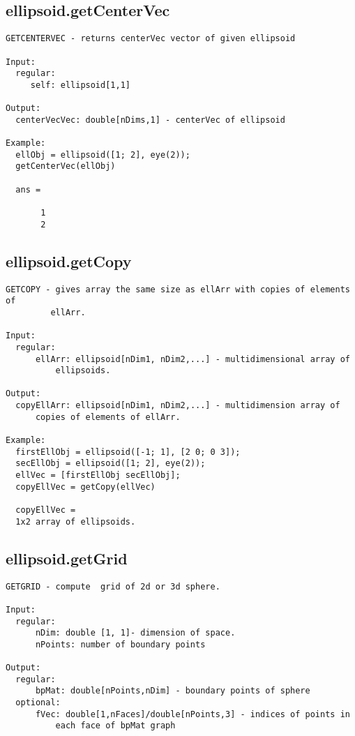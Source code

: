 \subsection{\texorpdfstring{ellipsoid.getCenterVec}{getCenterVec}}\label{method:ellipsoid.getCenterVec}
\begin{verbatim}
GETCENTERVEC - returns centerVec vector of given ellipsoid

Input:
  regular:
     self: ellipsoid[1,1]

Output:
  centerVecVec: double[nDims,1] - centerVec of ellipsoid

Example:
  ellObj = ellipsoid([1; 2], eye(2));
  getCenterVec(ellObj)

  ans =

       1
       2
\end{verbatim}
\subsection{\texorpdfstring{ellipsoid.getCopy}{getCopy}}\label{method:ellipsoid.getCopy}
\begin{verbatim}
GETCOPY - gives array the same size as ellArr with copies of elements of
         ellArr.

Input:
  regular:
      ellArr: ellipsoid[nDim1, nDim2,...] - multidimensional array of
          ellipsoids.

Output:
  copyEllArr: ellipsoid[nDim1, nDim2,...] - multidimension array of
      copies of elements of ellArr.

Example:
  firstEllObj = ellipsoid([-1; 1], [2 0; 0 3]);
  secEllObj = ellipsoid([1; 2], eye(2));
  ellVec = [firstEllObj secEllObj];
  copyEllVec = getCopy(ellVec)

  copyEllVec =
  1x2 array of ellipsoids.
\end{verbatim}
\subsection{\texorpdfstring{ellipsoid.getGrid}{getGrid}}\label{method:ellipsoid.getGrid}
\begin{verbatim}
GETGRID - compute  grid of 2d or 3d sphere.

Input:
  regular:
      nDim: double [1, 1]- dimension of space.
      nPoints: number of boundary points

Output:
  regular:
      bpMat: double[nPoints,nDim] - boundary points of sphere
  optional:
      fVec: double[1,nFaces]/double[nPoints,3] - indices of points in
          each face of bpMat graph
\end{verbatim}
